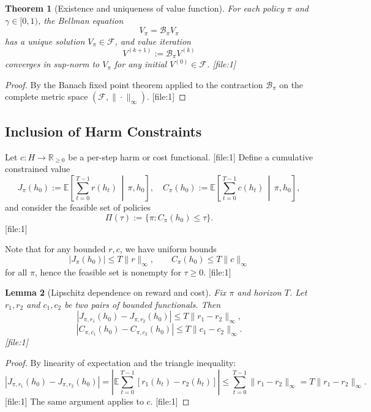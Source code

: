 \documentclass[11pt,a4paper]{article}
\theoremstyle{tealstyle}
\newtheorem{theorem}{Theorem}[section]
\newtheorem{lemma}[theorem]{Lemma}
\theoremstyle{definition}
\begin{document}
\begin{theorem}[Existence and uniqueness of value function]
For each policy \(\pi\) and \(\gamma \in [0,1)\), the Bellman equation
\[
  V_\pi = \mathcal{B}_\pi V_\pi
\]
has a unique solution \(V_\pi \in \mathcal{F}\), and value iteration
\[
  V^{(k+1)} := \mathcal{B}_\pi V^{(k)}
\]
converges in sup-norm to \(V_\pi\) for any initial \(V^{(0)} \in \mathcal{F}\). [file:1]
\end{theorem}

\begin{proof}
By the Banach fixed point theorem applied to the contraction \(\mathcal{B}_\pi\) on the complete metric space \((\mathcal{F},\|\cdot\|_\infty)\). [file:1]
\end{proof}

\subsection{Inclusion of Harm Constraints}

Let \(c : H \to \mathbb{R}_{\ge 0}\) be a per-step harm or cost functional. [file:1] Define a cumulative constrained value
\[
  J_\pi(h_0) := \mathbb{E}\left[\sum_{t=0}^{T-1} r(h_t) \,\middle|\, \pi, h_0\right], \quad
  C_\pi(h_0) := \mathbb{E}\left[\sum_{t=0}^{T-1} c(h_t) \,\middle|\, \pi, h_0\right],
\]
and consider the feasible set of policies
\[
  \Pi(\tau) := \{\pi : C_\pi(h_0) \le \tau\}.
\] [file:1]

Note that for any bounded \(r,c\), we have uniform bounds
\[
  |J_\pi(h_0)| \le T \|r\|_\infty, \qquad
  C_\pi(h_0) \le T \|c\|_\infty
\]
for all \(\pi\), hence the feasible set is nonempty for \(\tau \ge 0\). [file:1]

\begin{lemma}[Lipschitz dependence on reward and cost]
Fix \(\pi\) and horizon \(T\). Let \(r_1, r_2\) and \(c_1, c_2\) be two pairs of bounded functionals. Then
\[
  |J_{\pi,r_1}(h_0) - J_{\pi,r_2}(h_0)| \le T \|r_1 - r_2\|_\infty,
\]
\[
  |C_{\pi,c_1}(h_0) - C_{\pi,c_2}(h_0)| \le T \|c_1 - c_2\|_\infty.
\] [file:1]
\end{lemma}

\begin{proof}
By linearity of expectation and the triangle inequality:
\[
  |J_{\pi,r_1}(h_0) - J_{\pi,r_2}(h_0)|
  = \left|\mathbb{E}\sum_{t=0}^{T-1} [r_1(h_t) - r_2(h_t)]\right|
  \le \sum_{t=0}^{T-1} \|r_1 - r_2\|_\infty
  = T \|r_1 - r_2\|_\infty.
\] [file:1]
The same argument applies to \(c\). [file:1]
\end{proof}
\end{document}
